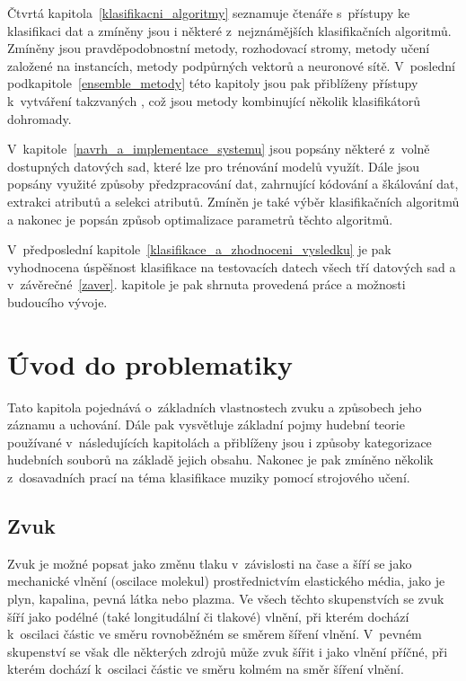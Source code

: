 Čtvrtá kapitola~\ref{klasifikacni_algoritmy} seznamuje čtenáře s~přístupy ke klasifikaci dat a zmíněny jsou i některé z~nejznámějších klasifikačních algoritmů. Zmíněny jsou pravděpodobnostní metody, rozhodovací stromy, metody učení založené na instancích, metody podpůrných vektorů a neuronové sítě. V~poslední podkapitole~\ref{ensemble_metody} této kapitoly jsou pak přiblíženy přístupy k~vytváření takzvaných , což jsou metody kombinující několik klasifikátorů dohromady.

V~kapitole~\ref{navrh_a_implementace_systemu} jsou popsány některé z~volně dostupných datových sad, které lze pro trénování modelů využít. Dále jsou popsány využité způsoby předzpracování dat, zahrnující kódování a škálování dat, extrakci atributů a selekci atributů. Zmíněn je také výběr klasifikačních algoritmů a nakonec je popsán způsob optimalizace parametrů těchto algoritmů.

V~předposlední kapitole~\ref{klasifikace_a_zhodnoceni_vysledku} je pak vyhodnocena úspěšnost klasifikace na testovacích datech všech tří datových sad a v~závěrečné~\ref{zaver}. kapitole je pak shrnuta provedená práce a možnosti budoucího vývoje.


\chapter{Úvod do problematiky}
\label{uvod_do_problematiky}
Tato kapitola pojednává o~základních vlastnostech zvuku a způsobech jeho záznamu a uchování. Dále pak vysvětluje základní pojmy hudební teorie používané v~následujících kapitolách a přiblíženy jsou i způsoby kategorizace hudebních souborů na základě jejich obsahu. Nakonec je pak zmíněno několik z~dosavadních prací na téma klasifikace muziky pomocí strojového učení.

\section{Zvuk}
\label{zvuk}
Zvuk je možné popsat jako změnu tlaku v~závislosti na čase a šíří se jako mechanické vlnění (oscilace molekul) prostřednictvím elastického média, jako je plyn, kapalina, pevná látka nebo plazma. Ve všech těchto skupenstvích se zvuk šíří jako podélné (také longitudální či tlakové) vlnění, při kterém dochází k~oscilaci částic ve směru rovnoběžném se směrem šíření vlnění. V~pevném skupenství se však dle některých zdrojů může zvuk šířit i jako vlnění příčné, při kterém dochází k~oscilaci částic ve směru kolmém na směr šíření vlnění.\cite{leisure_2017}\cite{music_theory}

